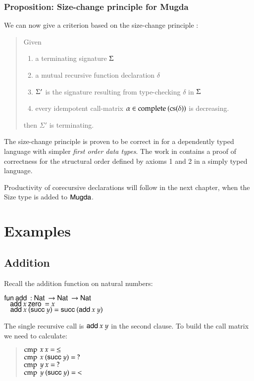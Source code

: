 \subsubsection{Proposition: Size-change principle for Mugda}
We can now give a criterion based on the size-change principle \cite{lee01sizechange}:
\begin{quote}
Given
\begin{enumerate}
\item
a terminating signature $\Sigma$
\item
a mutual recursive function declaration $\delta$
\item
$\Sigma'$ is the signature resulting from type-checking $\delta$ in $\Sigma$
\item
every idempotent call-matrix  $ \alpha \in \operatorname{complete} \: (\operatorname{cs}(\delta))$ is decreasing.
\end{enumerate}
then $\Sigma'$ is terminating.
\end{quote}
\noindent The size-change principle is proven to be correct in \cite{wahlstedt:phd:2007} for a dependently typed language 
with simpler \emph{first order data types}.
The work in \cite{abelAltenkirch:predStRec} contains a proof of correctness for the structural order defined by axioms 1 and 2 in a simply typed language. 

Productivity of corecursive declarations will follow in the next chapter, when the Size type is added to $\textsf{Mugda}$.

\section{Examples}

\subsection{Addition}

Recall the addition function on natural numbers:

\begin{bsp}
$\mathsf{fun}\: \mathsf{add}\: : \mathsf{Nat}\: \rightarrow \mathsf{Nat}\: \rightarrow \mathsf{Nat}\:$\\
$\hspace*{3mm} \mathsf{add}\: x \: \mathsf{zero}\: = x $\\
$\hspace*{3mm} \mathsf{add}\: x \: (\mathsf{succ}\: y) = \mathsf{succ}\: (\mathsf{add}\: x \: y)  $
\end{bsp}
The single recursive call is $\mathsf{add}\: x \: y$ in the second clause.
To build the call matrix we need to calculate:
\begin{quote}
$\operatorname{cmp} \: x \: x = \: \leq $\\
$\operatorname{cmp} \: x \: (\mathsf{succ}\: y) = \: ? $\\
$\operatorname{cmp} \: y \: x = \: ? $\\
$\operatorname{cmp} \: y \: (\mathsf{succ}\: y) = \: < $ 
\end{quote}

